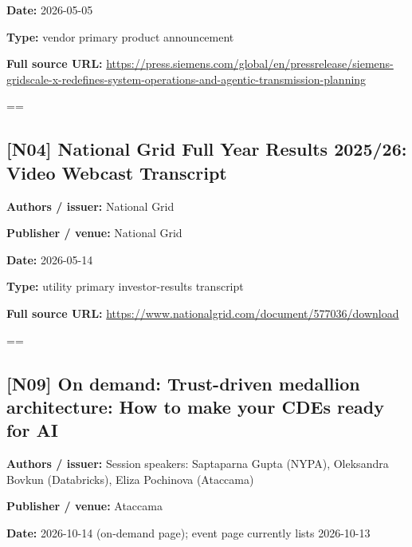 \documentclass[10pt,letterpaper]{article}
\begin{document}
\textbf{Date:} 2026-05-05\par
\textbf{Type:} vendor primary product announcement\par
\textbf{Full source URL:} \href{https://press.siemens.com/global/en/pressrelease/siemens-gridscale-x-redefines-system-operations-and-agentic-transmission-planning}{\small\ttfamily https:/\allowbreak{}/\allowbreak{}press.\allowbreak{}siemens.\allowbreak{}com/\allowbreak{}global/\allowbreak{}en/\allowbreak{}pressrelease/\allowbreak{}siemens-\allowbreak{}gridscale-\allowbreak{}x-\allowbreak{}redefines-\allowbreak{}system-\allowbreak{}operations-\allowbreak{}and-\allowbreak{}agentic-\allowbreak{}transmission-\allowbreak{}planning}\par
\egroup\par\noindent\box\readingEntry\par\medskip
\setbox\readingEntry=\vbox\bgroup\hsize=\linewidth\subsection*{[N04] National Grid Full Year Results 2025/26: Video Webcast Transcript}
\textbf{Authors / issuer:} National Grid\par
\textbf{Publisher / venue:} National Grid\par
\textbf{Date:} 2026-05-14\par
\textbf{Type:} utility primary investor-results transcript\par
\textbf{Full source URL:} \href{https://www.nationalgrid.com/document/577036/download}{\small\ttfamily https:/\allowbreak{}/\allowbreak{}www.\allowbreak{}nationalgrid.\allowbreak{}com/\allowbreak{}document/\allowbreak{}577036/\allowbreak{}download}\par
\egroup\par\noindent\box\readingEntry\par\medskip
\setbox\readingEntry=\vbox\bgroup\hsize=\linewidth\subsection*{[N09] On demand: Trust-driven medallion architecture: How to make your CDEs ready for AI}
\textbf{Authors / issuer:} Session speakers: Saptaparna Gupta (NYPA), Oleksandra Bovkun (Databricks), Eliza Pochinova (Ataccama)\par
\textbf{Publisher / venue:} Ataccama\par
\textbf{Date:} 2026-10-14 (on-demand page); event page currently lists 2026-10-13\par
\end{document}
